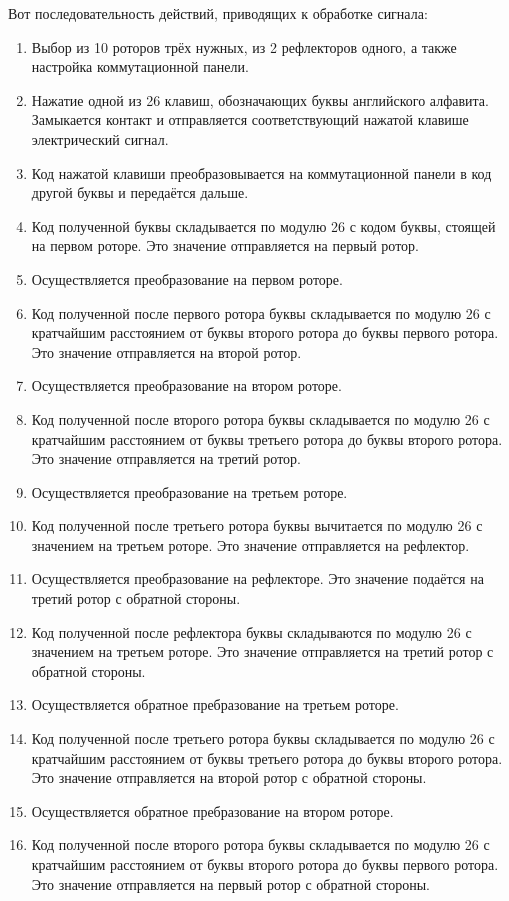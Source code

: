 Вот последовательность действий, приводящих к обработке сигнала:
\begin{enumerate}
	\item Выбор из 10 роторов трёх нужных, из 2 рефлекторов одного, а также настройка коммутационной панели.
	\item Нажатие одной из 26 клавиш, обозначающих буквы английского алфавита. Замыкается контакт и отправляется соответствующий нажатой клавише электрический сигнал.
	\item Код нажатой клавиши преобразовывается на коммутационной панели в код другой буквы и передаётся дальше.
	\item Код полученной буквы складывается по модулю 26 с кодом буквы, стоящей на первом роторе. Это значение отправляется на первый ротор.
	\item Осуществляется преобразование на первом роторе.
	\item Код полученной после первого ротора буквы складывается по модулю 26 с кратчайшим расстоянием от буквы второго ротора до буквы первого ротора. Это значение отправляется на второй ротор.
	\item Осуществляется преобразование на втором роторе.
	\item Код полученной после второго ротора буквы складывается по модулю 26 с кратчайшим расстоянием от буквы третьего ротора до буквы второго ротора. Это значение отправляется на третий ротор.
	\item Осуществляется преобразование на третьем роторе.
	\item Код полученной после третьего ротора буквы вычитается по модулю 26 с значением на третьем роторе. Это значение отправляется на рефлектор.
	\item Осуществляется преобразование на рефлекторе. Это значение подаётся на третий ротор с обратной стороны.
	\item Код полученной после рефлектора буквы складываются по модулю 26 с значением на третьем роторе. Это значение отправляется на третий ротор с обратной стороны.
	\item Осуществляется обратное пребразование на третьем роторе.
	\item Код полученной после третьего ротора буквы складывается по модулю 26 с кратчайшим расстоянием от буквы третьего ротора до буквы второго ротора. Это значение отправляется на второй ротор с обратной стороны.
	\item Осуществляется обратное пребразование на втором роторе.
	\item Код полученной после второго ротора буквы складывается по модулю 26 с кратчайшим расстоянием от буквы второго ротора до буквы первого ротора. Это значение отправляется на первый ротор с обратной стороны.

\end{enumerate}
